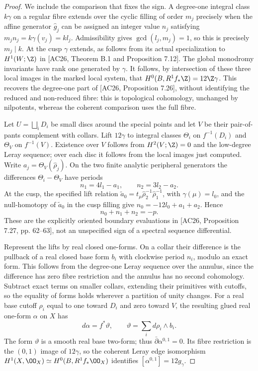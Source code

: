 \begin{proof}
We include the comparison that fixes the sign.  A degree-one integral
class $k\gamma$ on a regular fibre extends over the cyclic filling of
order $m_j$ precisely when the affine generator $\hat g_j$ can be
assigned an integer value $n_j$ satisfying
$m_j n_j=k\gamma(v_j)=kl_j$.  Admissibility gives
$\gcd(l_j,m_j)=1$, so this is precisely $m_j\mid k$.
At the cusp $\gamma$ extends, as follows from its actual specialization
to $H^1(W;\Z)$ in [AC26, Theorem B.1 and Proposition 7.12].
The global monodromy invariants have rank one generated by $\gamma$.
It follows, by intersection of these three local images in the marked
local system, that
$H^0(B,R^1f_*\Z)=12\Z\gamma$.  This recovers the degree-one
part of [AC26, Proposition 7.26], without identifying the reduced and
non-reduced fibre: this is topological cohomology, unchanged by
nilpotents, whereas the coherent comparison uses the full fibre.

Let $U=\bigsqcup_iD_i$ be small discs around the special points and
let $V$ be their pair-of-pants complement with collars.  Lift
$12\gamma$ to integral classes $\Theta_i$ on $f^{-1}(D_i)$ and
$\Theta_V$ on $f^{-1}(V)$.  Existence over $V$ follows from
$H^2(V;\Z)=0$ and the low-degree Leray sequence; over each disc it
follows from the local images just computed.  Write
$a_j=\Theta_V(\hat\rho_j)$.  On the two finite analytic peripheral generators
the differences $\Theta_i-\Theta_V$ have periods
\[
n_1=4l_1-a_1,\qquad n_2=3l_2-a_2.
\]
At the cusp, the specified lift relation
$\widetilde a_0=t_\mu\hat\rho_2^{-1}\hat\rho_1^{-1}$,
with $\gamma(\mu)=l_0$, and the null-homotopy of
$\widetilde a_0$ in the cusp filling give
$n_0=-12l_0+a_1+a_2$.  Hence
\begin{equation}\label{inv:eq:C-collar-sum}
n_0+n_1+n_2=-p.
\end{equation}
These are the explicitly oriented boundary evaluations in [AC26,
Proposition 7.27, pp. 62--63], not an unspecified sign of a spectral
sequence differential.

Represent the lifts by real closed one-forms.  On a collar their
difference is the pullback of a real closed base form $b_i$ with
clockwise period $n_i$, modulo an exact form.  This follows from the
degree-one Leray sequence over the annulus, since the difference has
zero fibre restriction and the annulus has no second cohomology.
Subtract exact terms on smaller collars, extending their primitives
with cutoffs, so the equality of forms holds wherever a partition of
unity changes.  For a real base cutoff $\rho_i$ equal to one toward
$D_i$ and zero toward $V$, the resulting glued real one-form $\alpha$
on $X$ has
\[
d\alpha=f^*\vartheta,\qquad
\vartheta=\sum_i d\rho_i\wedge b_i.
\]
The form $\vartheta$ is a smooth real base two-form; thus
$\bar\partial\alpha^{0,1}=0$.  Its fibre restriction is the
$(0,1)$ image of $12\gamma$, so the coherent Leray edge isomorphism
$H^1(X,\OO_X)\simeq H^0(B,R^1f_*\OO_X)$ identifies
$[\alpha^{0,1}]=12g_\gamma$.


\end{proof}
